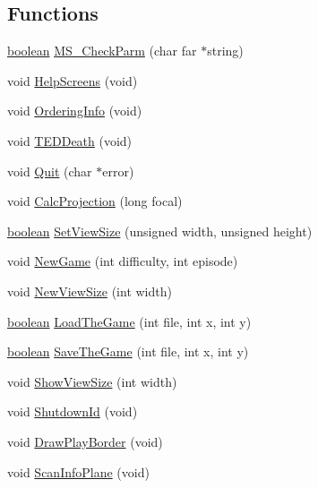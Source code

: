 \subsection*{Functions}
\begin{DoxyCompactItemize}
\item 
\hyperlink{ID__HEAD_8H_a7c6368b321bd9acd0149b030bb8275ed}{boolean} \hyperlink{WL__DEF_8H_ac99a26f457a07b937cf63c8bca858178}{MS\_\-CheckParm} (char far $\ast$string)
\item 
void \hyperlink{WL__DEF_8H_a7dfe666305b63dcb0a03ee9960b74d01}{HelpScreens} (void)
\item 
void \hyperlink{WL__DEF_8H_ab07ec92c4ccfc012fc8929d3493fda2e}{OrderingInfo} (void)
\item 
void \hyperlink{WL__DEF_8H_acc17ee7f6b4a6d3a5f3af994a06aae03}{TEDDeath} (void)
\item 
void \hyperlink{WL__DEF_8H_a66ba47a93e3e25204f4d72aee7614201}{Quit} (char $\ast$error)
\item 
void \hyperlink{WL__DEF_8H_a82156c01cf0c6b616ccb2bc2dff569a6}{CalcProjection} (long focal)
\item 
\hyperlink{ID__HEAD_8H_a7c6368b321bd9acd0149b030bb8275ed}{boolean} \hyperlink{WL__DEF_8H_af74ea12ed1f33b5eb32cee5062ea034c}{SetViewSize} (unsigned width, unsigned height)
\item 
void \hyperlink{WL__DEF_8H_af92c774866a68ff0737e216e1a7d09b2}{NewGame} (int difficulty, int episode)
\item 
void \hyperlink{WL__DEF_8H_accba26d21c8d31a42729fd0039d5c8e8}{NewViewSize} (int width)
\item 
\hyperlink{ID__HEAD_8H_a7c6368b321bd9acd0149b030bb8275ed}{boolean} \hyperlink{WL__DEF_8H_adff0b7d9c79b6ba94151102b17d7e8d2}{LoadTheGame} (int file, int x, int y)
\item 
\hyperlink{ID__HEAD_8H_a7c6368b321bd9acd0149b030bb8275ed}{boolean} \hyperlink{WL__DEF_8H_a4ba711129ae29569db9f9ee134a2779d}{SaveTheGame} (int file, int x, int y)
\item 
void \hyperlink{WL__DEF_8H_aa3aa2bb8e2e2e33f4c843747fd68c9c5}{ShowViewSize} (int width)
\item 
void \hyperlink{WL__DEF_8H_a715f77542ce1f3db369235ae2d841d2e}{ShutdownId} (void)
\item 
void \hyperlink{WL__DEF_8H_ade09a6750662d5cca8156a38ae0a4b7a}{DrawPlayBorder} (void)
\item 
void \hyperlink{WL__DEF_8H_a6bcecf9f4e1aed0d5a8de0e3395b73e7}{ScanInfoPlane} (void)
\item 

\end{DoxyCompactItemize}
